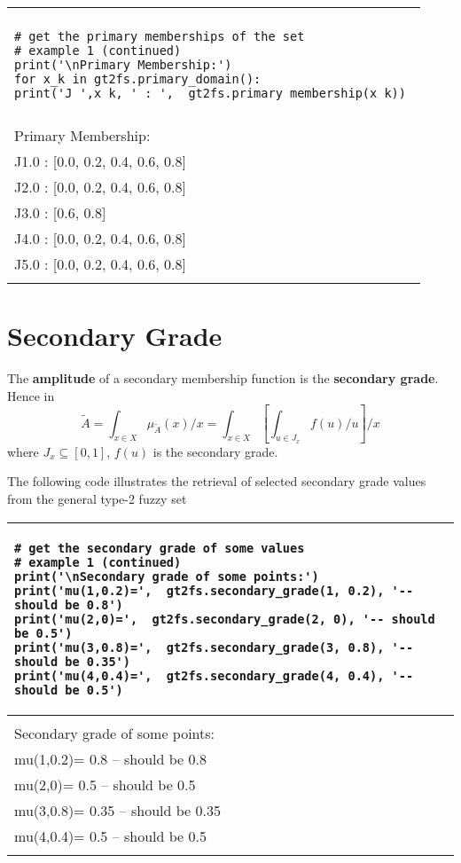 \documentclass[]{article}
\begin{document}
\begin{tabular}{|l|}
\hline 
\lstset{language=Python}
\lstset{basicstyle=\scriptsize}
\\
\begin{lstlisting}
# get the primary memberships of the set
# example 1 (continued)
print('\nPrimary Membership:')
for x_k in gt2fs.primary_domain():
print('J_',x_k, ' : ',  gt2fs.primary_membership(x_k)) 
\end{lstlisting}
\\
\hline
\\
{\small Primary Membership:}\\
{\small J1.0  :  [0.0, 0.2, 0.4, 0.6, 0.8]}\\
{\small J2.0  :  [0.0, 0.2, 0.4, 0.6, 0.8]}\\
{\small J3.0  :  [0.6, 0.8]}\\
{\small J4.0  :  [0.0, 0.2, 0.4, 0.6, 0.8]}\\
{\small J5.0  :  [0.0, 0.2, 0.4, 0.6, 0.8]}\\	
\\
\hline 
\end{tabular} 


\section{Secondary Grade}
The \textbf{amplitude} of a secondary membership function is the \textbf{secondary grade}. Hence in
\[
\tilde{A}=\int_{x \in X} \mu_{ \tilde{A} }(x) /x = \int_{x \in X} \left[  \int_{u\in J_{x}} f(u) / u \right]  /x
\]
where $J_{x} \subseteq [0,1]$, $f(u)$ is the secondary grade.

\bigskip

The following code illustrates the retrieval of selected secondary grade values from the general type-2 fuzzy set

\bigskip

\begin{tabular}{|l|}
\hline 
\lstset{language=Python}
\lstset{basicstyle=\scriptsize}
\begin{lstlisting}
# get the secondary grade of some values
# example 1 (continued)
print('\nSecondary grade of some points:')
print('mu(1,0.2)=',  gt2fs.secondary_grade(1, 0.2), '-- should be 0.8') 
print('mu(2,0)=',  gt2fs.secondary_grade(2, 0), '-- should be 0.5') 
print('mu(3,0.8)=',  gt2fs.secondary_grade(3, 0.8), '-- should be 0.35') 
print('mu(4,0.4)=',  gt2fs.secondary_grade(4, 0.4), '-- should be 0.5') 
\end{lstlisting}
\\
\hline
\\
{\small Secondary grade of some points:}\\
{\small mu(1,0.2)= 0.8 -- should be 0.8}\\
{\small mu(2,0)= 0.5 -- should be 0.5}\\
{\small mu(3,0.8)= 0.35 -- should be 0.35}\\
{\small mu(4,0.4)= 0.5 -- should be 0.5}\\
\\
\hline 
\end{tabular} 
\end{document}
